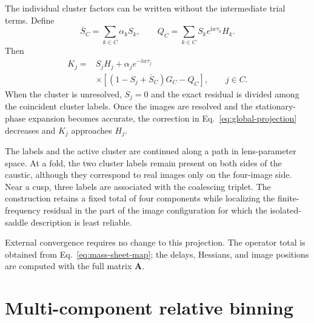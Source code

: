 \documentclass[aps,prd,twocolumn,nofootinbib,superscriptaddress,floatfix]{revtex4-2}
\newcommand{\ii}{\mathrm{i}}
\newcommand{\bA}{\bm{A}}
\begin{document}
The individual cluster factors can be written without the intermediate trial
terms.  Define
\begin{equation}
 \overline S_C=\sum_{k\in C}\alpha_kS_k,
 \qquad
 Q_C=\sum_{k\in C}S_k e^{\ii w\tau_k}H_k.
 \label{eq:Sbar-Q}
\end{equation}
Then
\begin{equation}
 \boxed{\begin{aligned}
 K_j={}&S_jH_j+\alpha_j e^{-\ii w\tau_j}\\
 &\times\left[(1-S_j+\overline S_C)G_C-Q_C\right],
 \qquad j\in C .
 \end{aligned}}
 \label{eq:explicit-K}
\end{equation}
When the cluster is unresolved, $S_j=0$ and the exact residual is divided
among the coincident cluster labels.  Once the images are resolved and the
stationary-phase expansion becomes accurate, the correction in
Eq.~\eqref{eq:global-projection} decreases and $K_j$ approaches $H_j$.

The labels and the active cluster are continued along a path in lens-parameter
space.  At a fold, the two cluster labels remain present on both sides of the
caustic, although they correspond to real images only on the four-image side.
Near a cusp, three labels are associated with the coalescing triplet.  The
construction retains a fixed total of four components while localizing the
finite-frequency residual in the part of the image configuration for which
the isolated-saddle description is least reliable.

External convergence requires no change to this projection.  The operator
total is obtained from Eq.~\eqref{eq:mass-sheet-map}; the delays, Hessians, and
image positions are computed with the full matrix $\bA$.

\section{Multi-component relative binning}
\label{sec:multichannel-rb}
\end{document}
